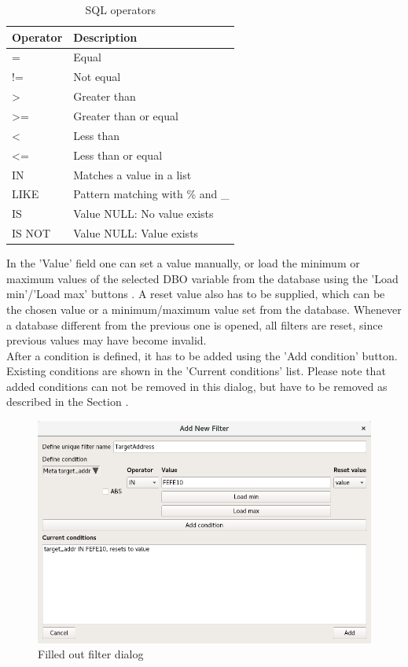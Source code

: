 \documentclass[10pt,letterpaper,extrafontsizes]{memoir}
\begin{document}
\begin{table}[H]
  \center
  \begin{tabular}{ | l | l |}
    \hline
    \textbf{Operator} & \textbf{Description} \\ \hline
    = & Equal \\ \hline
    != & Not equal \\ \hline
    > & Greater than \\ \hline
    >= & Greater than or equal \\ \hline
    < & Less than \\ \hline
    <= & Less than or equal \\ \hline
    IN & Matches a value in a list \\ \hline
    LIKE & Pattern matching with \% and \_ \\ \hline
    IS & Value NULL: No value exists \\ \hline
    IS NOT & Value NULL: Value exists \\
    \hline
  \end{tabular}
  \caption{SQL operators}
\end{table}

In the 'Value' field one can set a value manually, or load the minimum or maximum values of the selected DBO variable from the database using the 'Load min'/'Load max' buttons . A reset value also has to be supplied, which can be the chosen value or a minimum/maximum value set from the database.  Whenever a database different from the previous one is opened, all filters are reset, since previous values may have become invalid.\\

After a condition is defined, it has to be added using the 'Add condition' button. Existing conditions are
shown in the 'Current conditions' list. Please note that added conditions can not be removed in this dialog,
but have to be removed as described in the Section .

\begin{figure}[H]
  \center
    \includegraphics[width=14cm]{../screenshots/filter_add2.png}
  \caption{Filled out filter dialog}
  \label{fig:filter_add2}
\end{figure}
\end{document}
